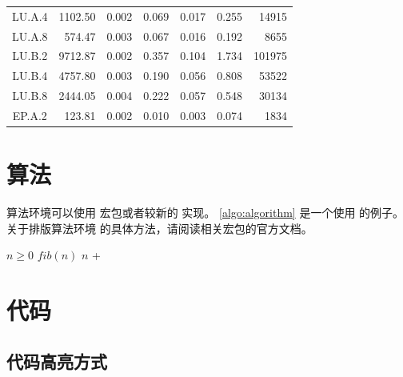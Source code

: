 \begin{ThreePartTable}
\begin{longtable}[c]{c*{6}{r}}
    LU.A.4                 & 1102.50                             & 0.002                               & 0.069          & 0.017 & 0.255 & 14915  \\
    LU.A.8                 & 574.47                              & 0.003                               & 0.067          & 0.016 & 0.192 & 8655   \\
    LU.B.2                 & 9712.87                             & 0.002                               & 0.357          & 0.104 & 1.734 & 101975 \\
    LU.B.4                 & 4757.80                             & 0.003                               & 0.190          & 0.056 & 0.808 & 53522  \\
    LU.B.8                 & 2444.05                             & 0.004                               & 0.222          & 0.057 & 0.548 & 30134  \\
    EP.A.2                 & 123.81                              & 0.002                               & 0.010          & 0.003 & 0.074 & 1834   \\
    \bottomrule
  \end{longtable}
\end{ThreePartTable}



\section{算法}

算法环境可以使用  宏包或者较新的  实现。
\cref{algo:algorithm} 是一个使用  的例子。关于排版算法环境
的具体方法，请阅读相关宏包的官方文档。

\begin{algorithm}
  \caption{计算斐波那契数列}\label{algo:algorithm}
  \begin{algorithmic}[1]
    \Require $n \geq 0$
    \Ensure $fib(n)$
    \State \Return $n$
    \Else
    \State \Return {} + 
    \EndIf
    \EndFunction
  \end{algorithmic}
\end{algorithm}

\section{代码}

\subsection{代码高亮方式}


